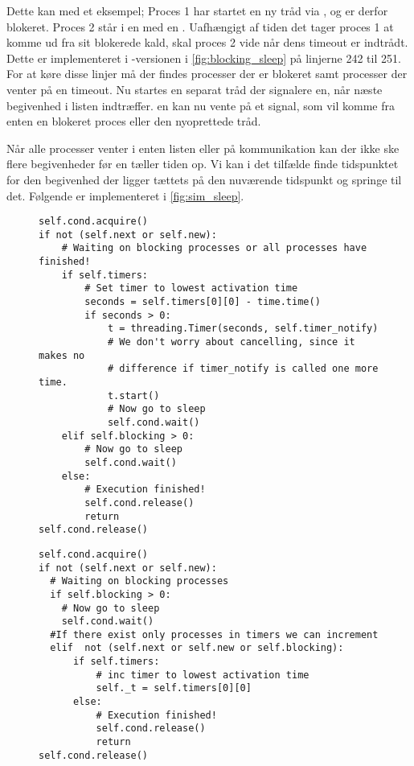  Dette kan  med et eksempel; Proces 1 har startet en ny tråd via , og er derfor blokeret. Proces 2 står i en  med en . Uafhængigt af tiden det tager proces 1 at komme ud fra sit blokerede kald, skal proces 2 vide når dens timeout er indtrådt. Dette er implementeret i -versionen i \cref{fig:blocking_sleep} på linjerne 242 til 251. For at køre disse linjer må  der findes processer der er blokeret samt processer der venter på en timeout. Nu startes en separat tråd der signalere \sched en, når næste begivenhed i  listen indtræffer. \Sched en kan nu vente på et signal, som vil komme fra enten en blokeret proces eller den nyoprettede tråd.



Når alle processer venter i enten  listen eller på kommunikation kan der ikke ske flere begivenheder før \sched en tæller tiden op. 
Vi kan i det tilfælde finde tidspunktet for den begivenhed der ligger tættets på den nuværende tidspunkt  og springe til det. Følgende er implementeret i \cref{fig:sim_sleep}.
\begin{figure}[hbtp]
\begin{minipage}[c]{\linewidth}
\begin{lstlisting}[firstnumber=239, label=fig:blocking_sleep, caption=Uddrag af \sched en i \code{Scheduler}]
self.cond.acquire()
if not (self.next or self.new):
    # Waiting on blocking processes or all processes have finished!
    if self.timers:
        # Set timer to lowest activation time
        seconds = self.timers[0][0] - time.time()
        if seconds > 0:
            t = threading.Timer(seconds, self.timer_notify)
            # We don't worry about cancelling, since it makes no 
            # difference if timer_notify is called one more time.
            t.start()
            # Now go to sleep
            self.cond.wait()
    elif self.blocking > 0:
        # Now go to sleep
        self.cond.wait()
    else:
        # Execution finished!
        self.cond.release()
        return
self.cond.release()
\end{lstlisting}
\end{minipage}
\begin{minipage}[c]{\linewidth}
\begin{lstlisting}[firstnumber=158, label=fig:sim_sleep, caption= uddrag af \sched en i \code{Simulation}]
self.cond.acquire()
if not (self.next or self.new):
  # Waiting on blocking processes
  if self.blocking > 0:
    # Now go to sleep
    self.cond.wait()
  #If there exist only processes in timers we can increment
  elif  not (self.next or self.new or self.blocking): 
      if self.timers:
          # inc timer to lowest activation time
          self._t = self.timers[0][0]
      else:
          # Execution finished!
          self.cond.release()
          return
self.cond.release()  
\end{lstlisting}
\end{minipage}
\end{figure}

